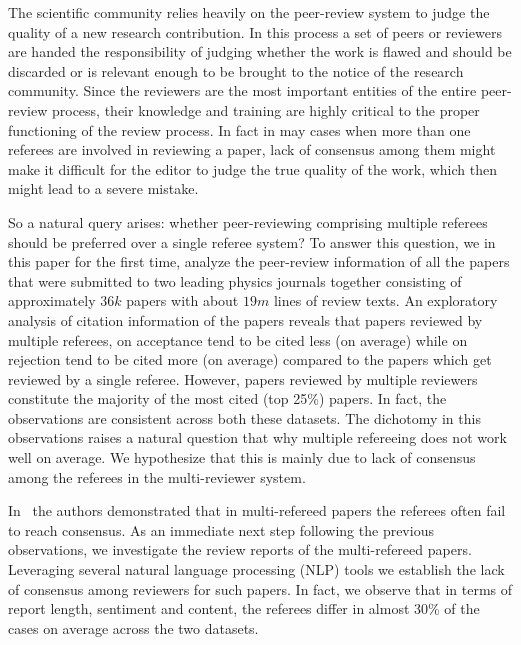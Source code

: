 \noindent
The scientific community relies heavily on the peer-review system to judge the quality of a new research contribution. In this process a set of 
peers or reviewers are handed the responsibility of judging whether the work is flawed and should be discarded or is relevant enough to be brought to the 
notice of the research community. Since the reviewers are the most important entities of the entire peer-review process, their knowledge and training are 
highly critical to the proper functioning of the review process. 
In fact in may cases when more than one referees are involved in reviewing a paper, lack of consensus among them might make it difficult for the editor to judge the 
true quality of the work, which then might lead to a severe mistake.

So a natural query arises: whether peer-reviewing comprising multiple referees should be preferred over a single referee system? 
To answer this question, we in this paper for the first time, 
analyze the peer-review information of all the papers that were submitted to two leading physics journals together consisting of approximately $36k$ papers with 
about $19m$ lines of review texts. 
An exploratory analysis of citation information of the papers reveals that papers 
reviewed by multiple referees, on acceptance tend to be cited less (on average) while on rejection tend to be cited more (on average) compared to the papers which get reviewed 
by a single referee.
However, papers reviewed by multiple reviewers constitute the majority of the most cited (top 25\%) papers. 
In fact, the observations 
are consistent across both these datasets. The dichotomy in this observations raises a natural question 
that why multiple refereeing does not work well on average. We hypothesize that this is mainly due to lack of consensus among the referees in the multi-reviewer system.

In~\cite{cole1981chance} the authors demonstrated that in multi-refereed papers the referees often fail to reach consensus. As an immediate next step following the 
previous observations, we investigate the review reports of the multi-refereed papers. Leveraging several natural language processing (NLP) tools we 
establish the lack of consensus among reviewers for such papers. In fact, we observe that in terms of report length, sentiment and content, the referees 
differ in almost 30\% of the cases on average across the two datasets.

